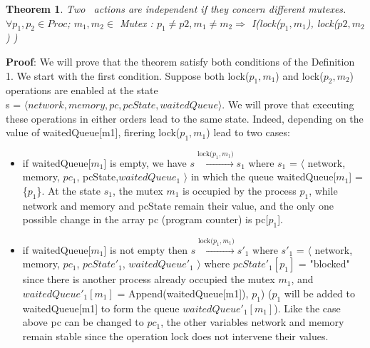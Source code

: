 \documentclass[a4paper,11pt]{article}
\newtheorem{theorem}{Theorem}[section]
\begin{document}
\begin{appendices}
\begin{theorem} Two \mutexlock~actions are independent if they concern different mutexes.\\  $\forall  p_1, p_2 \in Proc $; $m_1, m_2 \in $ Mutex : $p_1 \ne p2, m_1 \ne m_2 	\Rightarrow $ I(lock($p_1,m_1$), lock($p2, m_2$) )
\end{theorem}

 \textbf{Proof}: We will prove that the theorem satisfy both conditions of the Definition 1. We start with the first condition. Suppose both lock($p_1,m_1$) and lock($p_2, m_2$) operations are enabled at the state \\
  s = $\langle network, memory, pc, pcState, waitedQueue	\rangle$. We will prove that executing these operations in either orders lead to the same state. Indeed, depending on the value of waitedQueue[m1], firering lock($p_1,m_1$) lead to two cases: 
  \begin{itemize}
  	\item  if waitedQueue[$m_1$] is empty, we have  $s\xrightarrow{\text{lock($p_1, m_1$)}}s_1$ where $s_1$ = $\langle$ network, memory, $pc_1$, pcState,$waitedQueue_1$ $\rangle$ in which the queue waitedQueue[$m_1$] = \{$p_1$\}. At the state $s_1$, the mutex $m_1$ is occupied by the process $p_1$, while network and memory and pcState remain their value, and the only one possible change in the array pc (program counter) is pc[$p_1$].
  
  	\item if waitedQueue[$m_1$] is not empty then $s\xrightarrow{\text{lock($p_1, m_1$)}}s'_1$ where $s'_1$ = $\langle$ network, memory, $pc_1$, $pcState'_1$, $waitedQueue'_1$ $\rangle$ where $pcState'_1[p_1]$ = "blocked" since there is another process already occupied the mutex $m_1$, and  $waitedQueue'_1[m_1]$ = Append(waitedQueue[m1]), $p_1$) ($p_1$ will be added to waitedQueue[m1] to form the queue $waitedQueue'_1[m_1]$). Like the case above pc can be changed to $pc_1$, the other variables network and memory remain stable since the operation lock does not intervene their values.  
  \end{itemize}
  

\end{appendices}
\end{document}
